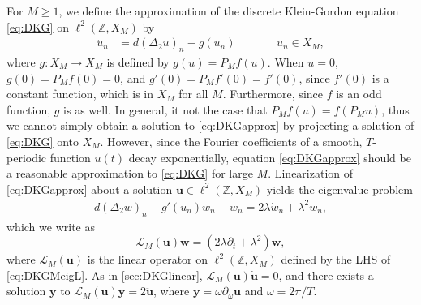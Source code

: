 \documentclass[12pt,reqno]{amsart}
\def\Z{{\mathbb Z}}
\def\calL{\mathcal{L}}
\newcommand{\uvec}{\mathbf{u}}
\newcommand{\wvec}{\mathbf{w}}
\newcommand{\yvec}{\mathbf{y}}
\theoremstyle{definition}
\begin{document}
For $M \geq 1$, we define the approximation of the discrete Klein-Gordon equation \cref{eq:DKG} on $\ell^2(\Z, X_M)$ by
\begin{equation}\label{eq:DKGapprox}
\begin{aligned}
\ddot{u}_n &= d (\Delta_2 u)_n - g(u_n) && \qquad u_n \in X_M,
\end{aligned}
\end{equation}
where $g: X_M \rightarrow X_M$ is defined by $g(u) = P_M f(u)$. When $u = 0$, $g(0) = P_M f(0) = 0$, and $g'(0) = P_M f'(0) = f'(0)$, since $f'(0)$ is a constant function, which is in $X_M$ for all $M$.
Furthermore, since $f$ is an odd function, $g$ is as well. In general, it not the case that $P_M f(u) = f(P_M u)$, thus we cannot simply obtain a solution to \cref{eq:DKGapprox} by projecting a solution of \cref{eq:DKG} onto $X_M$. However, since the Fourier coefficients of a smooth, $T$-periodic function $u(t)$ decay exponentially, equation \cref{eq:DKGapprox} should be a reasonable approximation to \cref{eq:DKG} for large $M$. Linearization of \cref{eq:DKGapprox} about a solution $\uvec \in \ell^2(\Z, X_M)$ yields the eigenvalue problem
\begin{equation}\label{eq:DKGMeig}
\begin{aligned}
d (\Delta_2 w)_n - g'(u_n)w_n - \ddot{w}_n = 2 \lambda \dot{w}_n + \lambda^2 w_n,
\end{aligned}
\end{equation}
which we write as
\begin{equation}\label{eq:DKGMeigL}
\calL_M(\uvec)\wvec = (2 \lambda \partial_t + \lambda^2 )\wvec,
\end{equation} 
where $\calL_M(\uvec)$ is the linear operator on $\ell^2(\Z, X_M)$ defined by the LHS of \cref{eq:DKGMeigL}. As in \cref{sec:DKGlinear}, $\calL_M(\uvec) \dot{\uvec} = 0$, and there exists a solution $\yvec$ to $\calL_M(\uvec) \yvec = 2 \ddot{\uvec}$, where $\yvec = \omega \partial_\omega \uvec$ and $\omega = 2 \pi / T$.
\end{document}
